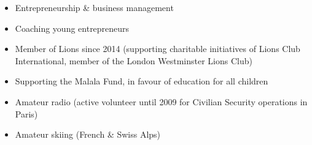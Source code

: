 


\divider


\divider


\divider


\divider


\medskip


\begin{itemize}
\item Entrepreneurship \& business management
\item Coaching young entrepreneurs
\item Member of Lions since 2014 (supporting charitable
initiatives of Lions Club International, member of the
London Westminster Lions Club)
\item Supporting the Malala Fund, in favour of education
for all children
\item Amateur radio (active volunteer until 2009 for
Civilian Security operations in Paris)
\item Amateur skiing (French \& Swiss Alps)
\end{itemize}




